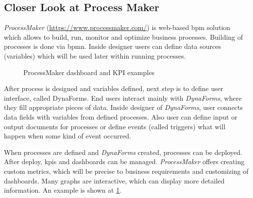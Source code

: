  \subsection{Closer Look at Process Maker}
 
 \textit{ProcessMaker} (\href{https://www.processmaker.com/}{https://www.processmaker.com/}) is web-based \gls{bpm} solution which allows to build, run, monitor and optimize business processes. Building of processes is done via \gls{bpmn}. Inside designer users can define data sources (variables) which will be used later within running processes. 
 
\begin{figure}[ht!]
    \centering
    \qquad
    \caption{ProcessMaker dashboard and KPI examples}%
    \label{fig:process-maker-dashboard}%
\end{figure}

 After process is designed and variables defined, next step is to define user interface, called DynaForms. End users interact mainly with \textit{DynaForms}, where they fill appropriate pieces of data. 
 Inside designer of \textit{DynaForms}, user connects data fields with variables from defined processes. Also user can define input or output documents for processes or define events (called triggers) what will happen when some kind of event occurred.
 
 When processes are defined and \textit{DynaForms} created, processes can be deployed. After deploy, \gls{kpi}s and dashboards can be managed. \textit{ProcessMaker} offers creating custom metrics, which will be precise to business requirements and customizing of dashboards. Many graphs are interactive, which can display more detailed information. An example is shown at \cref{fig:process-maker-dashboard}.
 
